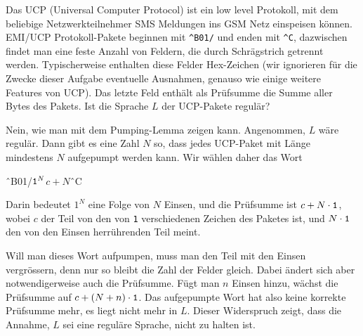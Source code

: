 Das UCP (Universal Computer Protocol) ist ein low level Protokoll,
mit dem beliebige Netzwerkteilnehmer SMS Meldungen ins GSM Netz einspeisen
können.
EMI/UCP Protokoll-Pakete beginnen mit \verb+^B01/+  und enden mit \verb+^C+,
dazwischen findet man eine feste Anzahl von Feldern, die durch
Schrägstrich getrennt werden. Typischerweise enthalten diese
Felder Hex-Zeichen (wir ignorieren für die Zwecke dieser Aufgabe
eventuelle Ausnahmen, genauso wie einige weitere Features von UCP).
Das letzte Feld enthält als Prüfsumme die
Summe aller Bytes des Pakets. Ist die Sprache $L$ der UCP-Pakete 
regulär?


\begin{loesung}
Nein, wie man mit dem Pumping-Lemma zeigen kann.
Angenommen, $L$ wäre regulär. Dann gibt es eine Zahl $N$ so,
dass jedes UCP-Paket mit Länge mindestens $N$ aufgepumpt werden
kann. Wir wählen daher das Wort 
\begin{center}
\^\ B01/$\text{\tt 1}^N$\text{/////}$c+N$\^\ C
\end{center}
Darin bedeutet $\text{1}^N$ eine Folge von $N$ Einsen, und die Prüfsumme
ist $c+N\cdot{\tt 1}$, wobei $c$ der Teil von den von {\tt 1}
verschiedenen Zeichen des Paketes ist, und $N\cdot\text{\tt 1}$
den von den Einsen herrührenden Teil meint.

Will man dieses Wort aufpumpen, muss man den Teil mit den Einsen
vergrössern, denn nur so bleibt die Zahl der Felder gleich. Dabei
ändert sich aber notwendigerweise auch die Prüfsumme. Fügt
man $n$ Einsen hinzu, wächst die Prüfsumme auf 
$c+(N+n)\cdot{\tt 1}$. Das aufgepumpte Wort hat also keine korrekte
Prüfsumme mehr, es liegt nicht mehr in $L$. Dieser Widerspruch
zeigt, dass die Annahme, $L$ sei eine reguläre Sprache, nicht zu
halten ist.
\end{loesung}
